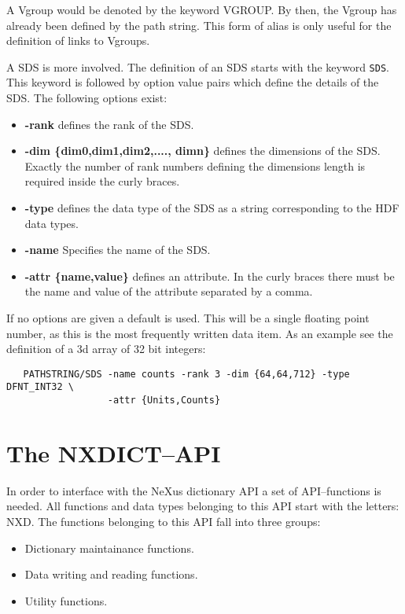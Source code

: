 \documentclass[12pt]{article}
\begin{document}
 A Vgroup would be denoted by the keyword VGROUP. By then, the Vgroup has
 already been defined by the path string. This form of alias is only useful
 for the definition of links to Vgroups.

 A SDS is more involved. The definition of an SDS starts with the keyword
 \verb+SDS+. This keyword is followed by option value pairs which define the 
  details of the SDS. The following options exist:
 \begin{itemize}
  \item {\bf -rank} defines the rank of the SDS.
  \item {\bf -dim \{dim0,dim1,dim2,...., dimn\} } defines the dimensions of the
       SDS. Exactly the number of rank numbers defining the dimensions
 length is required inside the curly braces. 
  \item {\bf -type} defines the data type of the SDS as a string corresponding
  to the HDF data types.
  \item {\bf -name} Specifies the name of the SDS.
  \item {\bf -attr \{name,value\} } defines an attribute. In the curly braces
   there must be the name and value of the attribute separated by a comma.
  \end{itemize}
  If no options are given a default is used. This will be a single floating
  point number, as this is the most frequently written data item. As an 
  example see the definition of a 3d array of 32 bit integers:
  \begin{verbatim}
   PATHSTRING/SDS -name counts -rank 3 -dim {64,64,712} -type DFNT_INT32 \
                  -attr {Units,Counts}      

  \end{verbatim}

  \section{The NXDICT--API}
  In order to interface with the NeXus dictionary API a set of
  API--functions is needed. All functions and data types belonging to
  this API start with the letters: NXD. The functions belonging to this API
  fall into three groups:
  \begin{itemize}
   \item Dictionary maintainance functions.
   \item Data writing and reading functions.
   \item Utility functions.
  \end{itemize}
  
\end{document}

